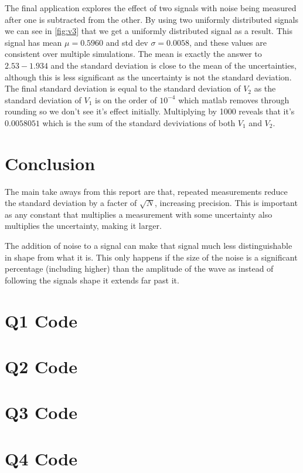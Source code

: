 \documentclass[a4paper, 12pt]{article}
\begin{document}
            The final application explores the effect of two signals with noise being measured after one is subtracted from the other. By using two uniformly distributed signals we can see in \cref{fig:v3} that we get a uniformly distributed signal as a result. This signal has mean $\mu = 0.5960$ and std dev $\sigma = 0.0058$, and these values are consistent over multiple simulations. The mean is exactly the answer to $2.53-1.934$ and the standard deviation is close to the mean of the uncertainties, although this is less significant as the uncertainty is not the standard deviation. The final standard deviation is equal to the standard deviation of $V_2$ as the standard deviation of $V_1$ is on the order of $10^{-4}$ which matlab removes through rounding so we don't see it's effect initially. Multiplying by 1000 reveals that it's $0.0058051$ which is the sum of the standard deviviations of both $V_1$ and $V_2$. 


    \section{Conclusion}
        The main take aways from this report are that, repeated measurements reduce the standard deviation by a facter of $\sqrt{N}$, increasing precision. This is important as any constant that multiplies a measurement with some uncertainty also multiplies the uncertainty, making it larger.
        \par
        The addition of noise to a signal can make that signal much less distinguishable in shape from what it is. This only happens if the size of the noise is a significant percentage (including higher) than the amplitude of the wave as instead of following the signals shape it extends far past it.
    
    

    \begin{appendices}
        \section{Q1 Code}
            
        \section{Q2 Code}
            
        \section{Q3 Code}
            
        \section{Q4 Code}
            
    \end{appendices}
\end{document}
